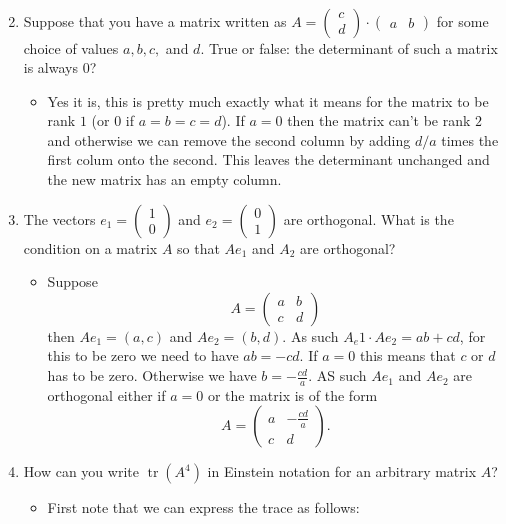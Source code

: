 \documentclass{article}
\begin{document}
\begin{enumerate}
$$\begin{aligned}
\end{aligned}
$$
\item Suppose that you have a matrix written as $A = \begin{pmatrix} c \\ d \end{pmatrix} \cdot \begin{pmatrix} a & b \end{pmatrix}$ for some choice of values $a, b, c,$ and $d$. True or false: the determinant of such a matrix is always $0$?
	\begin{itemize}
		\item Yes it is, this is pretty much exactly what it means for the matrix to be rank $1$ (or $0$ if $a = b = c = d$). If $a = 0$ then the matrix can't be rank $2$ and otherwise we can remove the second column by adding $d / a$ times the first colum onto the second. This leaves the determinant unchanged and the new matrix has an empty column.
	\end{itemize}
\item The vectors $e_1 = \begin{pmatrix} 1 \\ 0 \end{pmatrix}$ and $e_2 = \begin{pmatrix} 0 \\ 1 \end{pmatrix}$ are orthogonal. What is the condition on a matrix $A$ so that $Ae_1$ and $A_2$ are orthogonal?
	\begin{itemize}
		\item Suppose
		$$
		A = \begin{pmatrix} a & b \\ c & d \end{pmatrix}
		$$
		then $Ae_1 = (a, c)$ and $Ae_2 = (b, d)$. As such $A_e1 \cdot Ae_2 = ab + cd$, for this to be zero we need to have $ab = -cd$. If $a = 0$ this means that $c$ or $d$ has to be zero. Otherwise we have $b = - \frac{cd}{a}$. AS such $Ae_1$ and $Ae_2$ are orthogonal either if $a = 0$ or the matrix is of the form
		$$
		A = \begin{pmatrix} a & - \frac{cd}{a} \\ c & d \end{pmatrix}.
		$$
	\end{itemize}
\item How can you write $\operatorname{tr}(A^4)$ in Einstein notation for an arbitrary matrix $A$?
	\begin{itemize}
		\item First note that we can express the trace as follows:

\end{itemize}
\end{enumerate}
\end{document}
